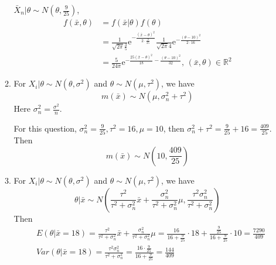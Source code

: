 \documentclass{article}
\begin{document}
\begin{enumerate}[leftmargin = 0 em, label = \arabic*., font = \bfseries]
\begin{enumerate}
 	$\bar{X}_n | \theta \sim N(\theta, \frac{9}{25})$,
 	\begin{align*}
 	f(\bar{x} , \theta) & = f(\bar{x}|\theta) f(\theta)\\
 	& = \frac{1}{\sqrt{2 \pi} \frac{3}{5}} \mathrm{e}^{-\frac{(\bar{x} - \theta)^2}{2 \cdot \frac{9}{25}}} \frac{1}{\sqrt{2 \pi} 4} \mathrm{e}^{- \frac{(\theta - 10)^2}{2 \cdot 16}}\\
 	& = \frac{5}{24 \pi} \mathrm{e}^{-\frac{25(\bar{x} - \theta)^2}{18} - \frac{(\theta - 10)^2}{32}}, \, (\bar{x}, \theta) \in \mathbb{R}^2
 	\end{align*}
 	
 	
 	\item 
 	For $X_i | \theta \sim N(\theta, \sigma^2)$ and $\theta \sim N(\mu , \tau^2)$, we have 
 	\[m(\bar{x}) \sim N(\mu, \sigma_n^2 + \tau^2)\]
 	Here $\sigma_n^2 = \frac{\sigma^2}{n}$.

 	For this question, $\sigma_n^2 = \frac{9}{25}, \tau^2 = 16, \mu  = 10$, then $\sigma_n^2 + \tau^2 = \frac{9}{25} + 16 = \frac{409}{25}$. Then
 	\[m(\bar{x}) \sim N(10, \frac{409}{25})\]


 	\item 
 	For $X_i | \theta \sim N(\theta, \sigma^2)$ and $\theta \sim N(\mu , \tau^2)$, we have 
 	\[\theta | \bar{x} \sim N\left(\frac{\tau^2}{\tau^2 + \sigma_n^2} \bar{x} + \frac{\sigma_n^2}{\tau^2 + \sigma_n^2} \mu , \frac{\tau^2 \sigma_n^2}{\tau^2 + \sigma_n^2}\right)\]
 	Then 
 	\begin{align*}
 	&E(\theta | \bar{x} = 18) = \frac{\tau^2}{\tau^2 + \sigma_n^2} \bar{x} + \frac{\sigma_n^2}{\tau^2 + \sigma_n^2} \mu = \frac{16}{16 + \frac{9}{25}} \cdot 18 + \frac{\frac{9}{25}}{16 + \frac{9}{25}} \cdot 10 = \frac{7290}{409}\\
 	& Var(\theta | \bar{x} = 18) = \frac{\tau^2 \sigma_n^2}{\tau^2 + \sigma_n^2} = \frac{16 \cdot \frac{9}{25}}{16 + \frac{9}{25}} = \frac{144}{409}
 	\end{align*}
 	 	\end{enumerate}


\end{enumerate}
\end{document}
